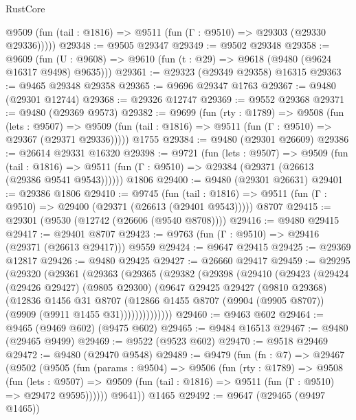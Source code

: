 \begin{lexlean}{RustCore}
\begin{coremodule}
      @9509 (fun (tail : @1816) => @9511 (fun (Γ : @9510) => @29303 (@29330 @29336)))))
@29348 := @9505 @29347
@29349 := @9502 @29348
@29358 := @9609
    (fun (U : @9608) => @9610 (fun (t : @29) => @9618 (@9480 (@9624 @16317 @9498) @9635)))
@29361 := @29323 (@29349 @29358) @16315
@29363 := @9465 @29348 @29358
@29365 := @9696 @29347 @1763
@29367 := @9480 (@29301 @12744)
@29368 := @29326 @12747
@29369 := @9552 @29368
@29371 := @9480 (@29369 @9573)
@29382 := @9699
    (fun (rty : @1789) =>
    @9508
      (fun (lets : @9507) =>
      @9509 (fun (tail : @1816) => @9511 (fun (Γ : @9510) => @29367 (@29371 @29336)))))
    @1755
@29384 := @9480 (@29301 @26609)
@29386 := @26614 @29331 @16320
@29398 := @9721
    (fun (lets : @9507) =>
    @9509
      (fun (tail : @1816) =>
      @9511 (fun (Γ : @9510) => @29384 (@29371 (@26613 (@29386 @9541 @9543))))))
    @1806
@29400 := @9480 (@29301 @26631)
@29401 := @29386 @1806
@29410 := @9745
    (fun (tail : @1816) => @9511 (fun (Γ : @9510) => @29400 (@29371 (@26613 (@29401 @9543)))))
    @8707
@29415 := @29301 (@9530 (@12742 (@26606 (@9540 @8708))))
@29416 := @9480 @29415
@29417 := @29401 @8707
@29423 := @9763 (fun (Γ : @9510) => @29416 (@29371 (@26613 @29417))) @9559
@29424 := @9647 @29415
@29425 := @29369 @12817
@29426 := @9480 @29425
@29427 := @26660 @29417
@29459 := @29295
    (@29320
      (@29361
        (@29363
          (@29365
            (@29382
              (@29398
                (@29410
                  (@29423
                    (@29424
                      (@29426 @29427)
                      (@9805 @29300)
                      (@9647
                        @29425
                        @29427
                        (@9810 @29368)
                        (@12836
                          @1456
                          @31
                          @8707
                          (@12866
                            @1455
                            @8707
                            (@9904 (@9905 @8707))
                            (@9909 (@9911 @1455 @31))))))))))))))
@29460 := @9463 @602
@29464 := @9465 (@9469 @602) (@9475 @602)
@29465 := @9484 @16513
@29467 := @9480 (@29465 @9499)
@29469 := @9522 (@9523 @602)
@29470 := @9518 @29469
@29472 := @9480 (@29470 @9548)
@29489 := @9479
    (fun (fn : @7) =>
    @29467
      (@9502
        (@9505
          (fun (params : @9504) =>
          @9506
            (fun (rty : @1789) =>
            @9508
              (fun (lets : @9507) =>
              @9509 (fun (tail : @1816) => @9511 (fun (Γ : @9510) => @29472 @9595))))))
        @9641))
    @1465
@29492 := @9647 (@29465 (@9497 @1465))

\end{coremodule}
\end{lexlean}
